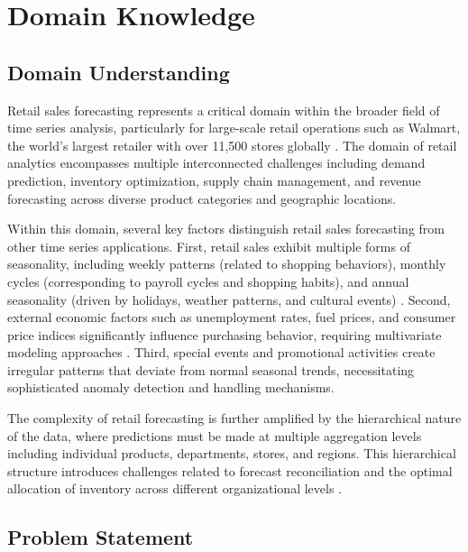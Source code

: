 %
%
%

\chapter{Domain Knowledge}

\section{Domain Understanding}

Retail sales forecasting represents a critical domain within the broader field of time series analysis, particularly for large-scale retail operations such as Walmart, the world's largest retailer with over 11,500 stores globally \cite{Zhang:2021}. The domain of retail analytics encompasses multiple interconnected challenges including demand prediction, inventory optimization, supply chain management, and revenue forecasting across diverse product categories and geographic locations.

Within this domain, several key factors distinguish retail sales forecasting from other time series applications. First, retail sales exhibit multiple forms of seasonality, including weekly patterns (related to shopping behaviors), monthly cycles (corresponding to payroll cycles and shopping habits), and annual seasonality (driven by holidays, weather patterns, and cultural events) \cite{McElroy:2018}. Second, external economic factors such as unemployment rates, fuel prices, and consumer price indices significantly influence purchasing behavior, requiring multivariate modeling approaches \cite{Loyal:2017}. Third, special events and promotional activities create irregular patterns that deviate from normal seasonal trends, necessitating sophisticated anomaly detection and handling mechanisms.

The complexity of retail forecasting is further amplified by the hierarchical nature of the data, where predictions must be made at multiple aggregation levels including individual products, departments, stores, and regions. This hierarchical structure introduces challenges related to forecast reconciliation and the optimal allocation of inventory across different organizational levels \cite{Fildes:2019}.

\section{Problem Statement}

